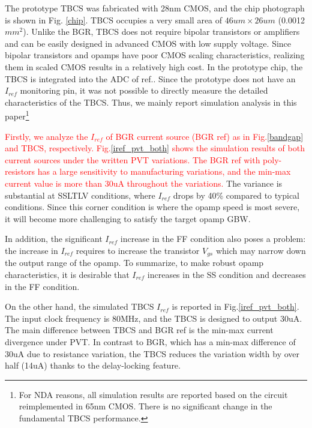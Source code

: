 \documentclass[paper]{ieice}
\begin{document}
\qquad The prototype TBCS was fabricated with 28nm CMOS, and the chip photograph is shown in Fig. \ref{chip}. TBCS occupies a very small area of $46um \times 26um$ (0.0012$mm^2$). Unlike the BGR, TBCS does not require bipolar transistors or amplifiers and can be easily designed in advanced CMOS with low supply voltage. Since bipolar transistors and opamps have poor CMOS scaling characteristics, realizing them in scaled CMOS results in a relatively high cost. In the prototype chip, the TBCS is integrated into the ADC of ref.\cite{yoshioka201728}. Since the prototype does not have an $I_{ref}$ monitoring pin, it was not possible to directly measure the detailed characteristics of the TBCS. Thus, we mainly report simulation analysis in this paper\footnote{For NDA reasons, all simulation results are reported based on the circuit reimplemented in 65nm CMOS. There is no significant change in the fundamental TBCS performance.}

\textcolor{red}{Firstly, we analyze the $I_{ref}$ of BGR current source (BGR ref)\cite{banba1999cmos} as in Fig.\ref{bandgap} and TBCS, respectively. Fig.\ref{iref_pvt_both} shows the simulation results of both current sources under the written PVT variations. The BGR ref with poly-resistors has a large sensitivity to manufacturing variations, and the min-max current value is more than 30uA throughout the variations.} The variance is substantial at SSLTLV conditions, where $I_{ref}$ drops by 40\% compared to typical conditions.
Since this corner condition is where the opamp speed is most severe, it will become more challenging to satisfy the target opamp GBW. %

In addition, the significant $I_{ref}$ increase in the FF condition also poses a problem: the increase in $I_{ref}$ requires to increase the transistor $V_{gs}$ which may narrow down the output range of the opamp. To summarize, to make robust opamp characteristics, it is desirable that $I_{ref}$ increases in the SS condition and decreases in the FF condition.

On the other hand, the simulated TBCS $I_{ref}$ is reported in Fig.\ref{iref_pvt_both}. The input clock frequency is 80MHz, and the TBCS is designed to output 30uA. The main difference between TBCS and BGR ref is the min-max current divergence under PVT. In contrast to BGR, which has a min-max difference of 30uA due to resistance variation, the TBCS reduces the variation width by over half (14uA) thanks to the delay-locking feature.
\end{document}
